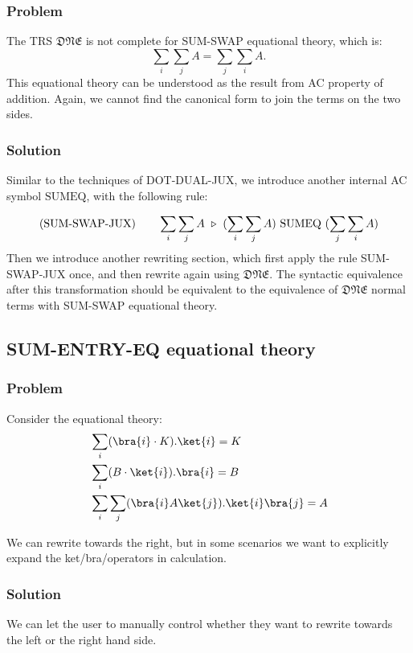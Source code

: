 \subsubsection*{Problem}
The TRS $\mathfrak{DNE}$ is not complete for \textsf{SUM-SWAP} equational theory, which is:
$$
\sum_i \sum_j A = \sum_j \sum_i A.
$$
This equational theory can be understood as the result from AC property of addition. Again, we cannot find the canonical form to join the terms on the two sides.

\subsubsection*{Solution}
Similar to the techniques of DOT-DUAL-JUX, we introduce another internal AC symbol $\textrm{SUMEQ}$, with the following rule:

$$
\textrm{(SUM-SWAP-JUX)} \qquad \sum_i \sum_j A \ \triangleright\  (\sum_i \sum_j A)\ \textrm{SUMEQ}\ (\sum_j \sum_i A)
$$
Then we introduce another rewriting section, which first apply the rule SUM-SWAP-JUX once, and then rewrite again using $\mathfrak{DNE}$. The syntactic equivalence after this transformation should be equivalent to the equivalence of $\mathfrak{DNE}$ normal terms with \textsf{SUM-SWAP} equational theory.

\subsection{\textsf{SUM-ENTRY-EQ} equational theory}

\subsubsection*{Problem}
Consider the equational theory:
\begin{align*}
  & \sum_i (\bra{i} \cdot K).\ket{i} = K \\
  & \sum_i (B \cdot \ket{i}).\bra{i} = B \\
  & \sum_i \sum_j (\bra{i} A \ket{j}).\ket{i}\bra{j} = A
\end{align*}

We can rewrite towards the right, but in some scenarios we want to explicitly expand the ket/bra/operators in calculation.

\subsubsection*{Solution}
We can let the user to manually control whether they want to rewrite towards the left or the right hand side.


